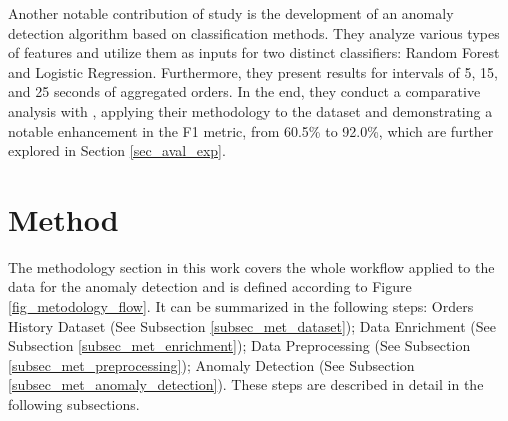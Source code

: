 \documentclass[12pt]{article}
\begin{document}
	Another notable contribution of \citet{lamorgia2020} study is the development of an anomaly detection algorithm based on classification methods.
	They analyze various types of features and utilize them as inputs for two distinct classifiers: Random Forest and Logistic Regression.
	Furthermore, they present results for intervals of 5, 15, and 25 seconds of aggregated orders.
	In the end, they conduct a comparative analysis with \citet{kamps2018}, applying their methodology to the dataset and demonstrating a notable enhancement in the F1 metric, from 60.5\% to 92.0\%, which are further explored in Section \ref{sec_aval_exp}.

	
	\section{Method}
	\label{sec_metodo}

	The methodology section in this work covers the whole workflow applied to the data for the anomaly detection and is defined according to Figure \ref{fig_metodology_flow}.
	It can be summarized in the following steps:
	    Orders History Dataset (See Subsection \ref{subsec_met_dataset});
	    Data Enrichment (See Subsection \ref{subsec_met_enrichment});
	    Data Preprocessing (See Subsection \ref{subsec_met_preprocessing});
	    Anomaly Detection (See Subsection \ref{subsec_met_anomaly_detection}).
	These steps are described in detail in the following subsections.
\end{document}
